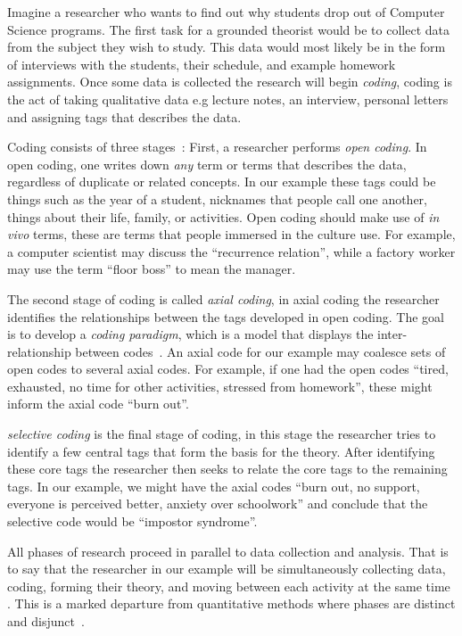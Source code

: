 \documentclass[sigconf]{acmart}
\begin{document}
Imagine a researcher who wants to find out why students drop out of
Computer Science programs. The first task for a grounded theorist would be to
collect data from the subject they wish to study. This data would most likely be
in the form of interviews with the students, their schedule, and example
homework assignments. Once some data is collected the research will begin
\emph{coding}, coding is the act of taking qualitative data e.g lecture notes,
an interview, personal letters and assigning tags that describes the data.
 
Coding consists of three stages~\cite{corbin2014basics}: First, a researcher
performs \emph{open coding}. In open coding, one writes down \emph{any} term or
terms that describes the data, regardless of duplicate or related concepts. In
our example these tags could be things such as the year of a student, nicknames
that people call one another, things about their life, family, or activities.
Open coding should make use of \emph{in vivo} terms, these are terms that people
immersed in the culture use. For example, a computer scientist may discuss the
``recurrence relation'', while a factory worker may use the term ``floor boss''
to mean the manager.
 
The second stage of coding is called \emph{axial coding}, in axial coding the
researcher identifies the relationships between the tags developed in open
coding. The goal is to develop a \emph{coding paradigm}, which is a model that
displays the inter-relationship between codes~\cite{corbin2014basics}. An axial
code for our example may coalesce sets of open codes to several axial codes. For
example, if one had the open codes ``tired, exhausted, no time for other
activities, stressed from homework'', these might inform the axial code ``burn
out''.
 
\emph{selective coding} is the final stage of coding, in this stage the
researcher tries to identify a few central tags that form the basis for the
theory. After identifying these core tags the researcher then seeks to relate
the core tags to the remaining tags. In our example, we might have
the axial codes ``burn out, no support, everyone is perceived better, anxiety
over schoolwork'' and conclude that the selective code would be
``impostor syndrome''.
 
All phases of research proceed in parallel to data collection and analysis. That
is to say that the researcher in our example will be simultaneously collecting
data, coding, forming their theory, and moving between each activity at the
same time . This is a marked departure from quantitative methods where phases
are distinct and disjunct~\cite{Strauss67discoveryof}.
\end{document}
